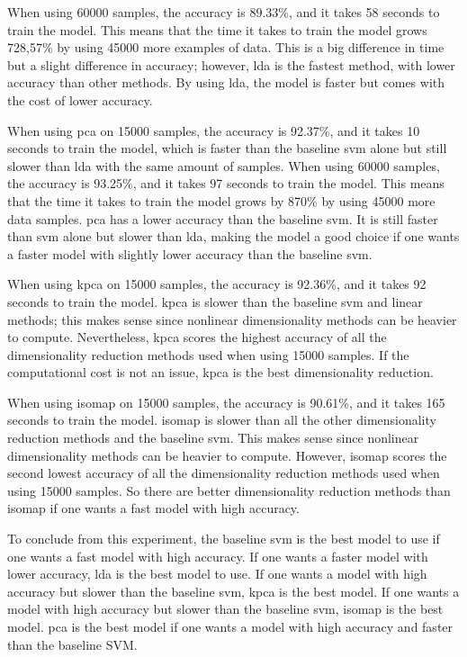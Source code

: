 When using 60000 samples, the accuracy is 89.33\%, and it takes 58 seconds to train the model. This means that the time it takes to train the model grows 728,57\% by using 45000 more examples of data. This is a big difference in time but a slight difference in accuracy; however, \gls{lda} is the fastest method, with lower accuracy than other methods. By using \gls{lda}, the model is faster but comes with the cost of lower accuracy.

When using \gls{pca} on 15000 samples, the accuracy is 92.37\%, and it takes 10 seconds to train the model, which is faster than the baseline \gls{svm} alone but still slower than \gls{lda} with the same amount of samples. When using 60000 samples, the accuracy is 93.25\%, and it takes 97 seconds to train the model. This means that the time it takes to train the model grows by 870\% by using 45000 more data samples. \gls{pca} has a lower accuracy than the baseline \gls{svm}. It is still faster than \gls{svm} alone but slower than \gls{lda}, making the model a good choice if one wants a faster model with slightly lower accuracy than the baseline \gls{svm}.

When using \gls{kpca} on 15000 samples, the accuracy is 92.36\%, and it takes 92 seconds to train the model. \gls{kpca} is slower than the baseline \gls{svm} and linear methods; this makes sense since nonlinear dimensionality methods can be heavier to compute. Nevertheless, \gls{kpca} scores the highest accuracy of all the dimensionality reduction methods used when using 15000 samples. If the computational cost is not an issue, \gls{kpca} is the best dimensionality reduction.

When using \gls{isomap} on 15000 samples, the accuracy is 90.61\%, and it takes 165 seconds to train the model. \gls{isomap} is slower than all the other dimensionality reduction methods and the baseline \gls{svm}. This makes sense since nonlinear dimensionality methods can be heavier to compute. However, \gls{isomap} scores the second lowest accuracy of all the dimensionality reduction methods used when using 15000 samples. So there are better dimensionality reduction methods than \gls{isomap} if one wants a fast model with high accuracy.

To conclude from this experiment, the baseline \gls{svm} is the best model to use if one wants a fast model with high accuracy. If one wants a faster model with lower accuracy, \gls{lda} is the best model to use. If one wants a model with high accuracy but slower than the baseline \gls{svm}, \gls{kpca} is the best model. If one wants a model with high accuracy but slower than the baseline \gls{svm}, \gls{isomap} is the best model. \gls{pca} is the best model if one wants a model with high accuracy and faster than the baseline SVM.

